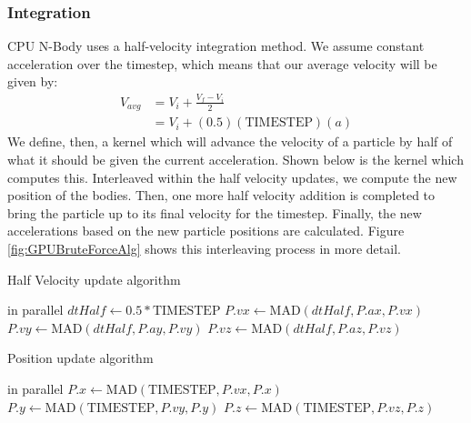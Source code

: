 \documentclass{thesis}
\begin{document}
\subsubsection{Integration}
CPU N-Body uses a half-velocity integration method. We assume constant acceleration over the timestep, which means that our average velocity will be given by:
\begin{align}
    V_{avg} &= V_i + \frac{V_f - V_i}{2}\\
            &= V_i + (0.5)(\text{TIMESTEP})(a)
\end{align}
We define, then, a kernel which will advance the velocity of a particle by half of what it should be given the current acceleration. Shown below is the kernel which computes this.
Interleaved within the half velocity updates, we compute the new position of the bodies. Then, one more half velocity addition is completed to bring the particle up to its final velocity for the timestep. Finally, the new accelerations based on the new particle positions are calculated. Figure \ref{fig:GPUBruteForceAlg} shows this interleaving process in more detail.
\begin{algorithm}
    \label{alg:HalfVelocity}
    \caption{Half Velocity update algorithm}
    \begin{algorithmic}
         in parallel
            \State $dtHalf \gets 0.5 * \text{TIMESTEP}$
            \State $P.vx \gets \text{MAD}(dtHalf, P.ax, P.vx)$
            \State $P.vy \gets \text{MAD}(dtHalf, P.ay, P.vy)$
            \State $P.vz \gets \text{MAD}(dtHalf, P.az, P.vz)$
        \EndFor
    \end{algorithmic}
\end{algorithm}
\begin{algorithm}
    \label{alg:PositionUpdate}
    \caption{Position update algorithm}
    \begin{algorithmic}
         in parallel
            \State $P.x \gets \text{MAD}(\text{TIMESTEP}, P.vx, P.x)$
            \State $P.y \gets \text{MAD}(\text{TIMESTEP}, P.vy, P.y)$
            \State $P.z \gets \text{MAD}(\text{TIMESTEP}, P.vz, P.z)$
        \EndFor
    \end{algorithmic}
\end{algorithm}
\end{document}
